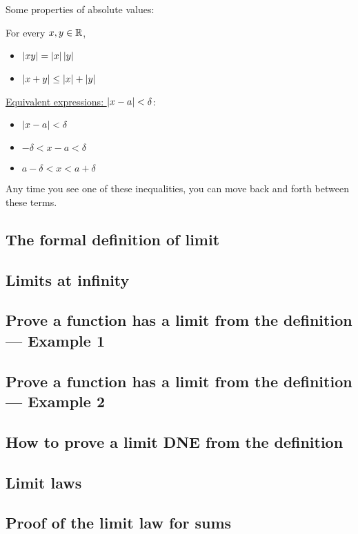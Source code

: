 Some properties of absolute values:

For every \(x, y \in \mathbb{R}\),

\begin{itemize}
  \item \(\left|xy\right| = \left|x\right| \left|y\right|\)
  \item \(\left|x + y\right| \leq \left|x\right| + \left|y\right|\)
\end{itemize}

\underline{Equivalent expressions: \(\left|x - a\right| < \delta\)}:


\begin{itemize}
  \item \(\left|x - a\right| < \delta\)
  \item \(- \delta < x - a < \delta\)
  \item \(a - \delta < x < a + \delta\)
\end{itemize}

Any time you see one of these inequalities, you can move back and forth between these terms.

\subsection{The formal definition of limit}
\subsection{Limits at infinity}
\subsection{Prove a function has a limit from the definition --- Example 1}
\subsection{Prove a function has a limit from the definition --- Example 2}
\subsection{How to prove a limit DNE from the definition}
\subsection{Limit laws}
\subsection{Proof of the limit law for sums}
